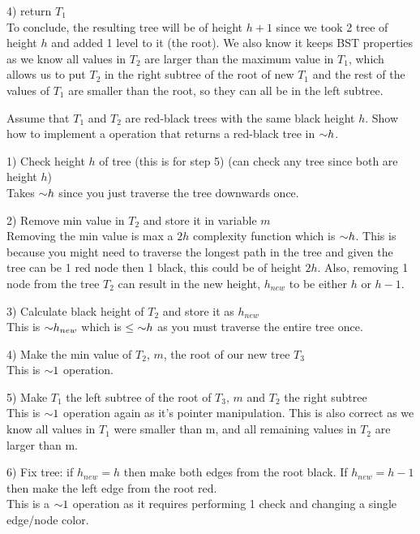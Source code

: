 \begin{problem}
\begin{questions}
4) return $T_1$\\

To conclude, the resulting tree will be of height $h+1$ since we took 2 tree of height $h$ and added 1 level to it (the root). We also know it keeps BST properties as we know all values in $T_2$ are larger than the maximum value in $T_1$, which allows us to put $T_2$ in the right subtree of the root of new $T_1$ and the rest of the values of $T_1$ are smaller than the root, so they can all be in the left subtree.

\item Assume that $T_1$ and $T_2$ are red-black trees with the same black height $h$. Show how to implement a  operation that returns a red-black tree in $\mathord{\sim}h$.

1) Check height $h$ of tree (this is for step 5) (can check any tree since both are height $h$)\\
Takes $\mathord{\sim}h$ since you just traverse the tree downwards once.

2) Remove min value in $T_2$ and store it in variable $m$\\
Removing the min value is max a $2h$ complexity function which is $\mathord{\sim}h$. This is because you might need to traverse the longest path in the tree and given the tree can be 1 red node then 1 black, this could be of height $2h$.
Also, removing 1 node from the tree $T_2$ can result in the new height, $h_{new}$ to be either $h$ or $h-1$.

3) Calculate black height of $T_2$ and store it as $h_{new}$\\
This is $\mathord{\sim}h_{new}$ which is $\leq \mathord{\sim}h$ as you must traverse the entire tree once. 

4) Make the min value of $T_2$, $m$, the root of our new tree $T_3$\\
This is $\mathord{\sim}1$ operation.

5) Make $T_1$ the left subtree of the root of $T_3$, $m$ and $T_2$ the right subtree\\
This is $\mathord{\sim}1$ operation again as it's pointer manipulation. 
This is also correct as we know all values in $T_1$ were smaller than m, and all remaining values in $T_2$ are larger than m.

6) Fix tree: if $h_{new} = h$ then make both edges from the root black. If $h_{new} = h-1$ then make the left edge from the root red.\\
This is a $\mathord{\sim}1$ operation as it requires performing 1 check and changing a single edge/node color. 


\end{questions}
\end{problem}
